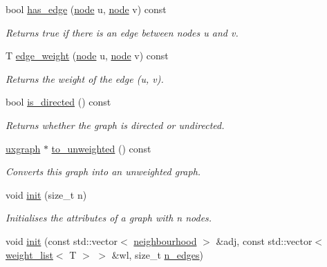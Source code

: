 \begin{DoxyCompactItemize}
bool \hyperlink{classlgraph_1_1wdgraph_a29a56bd2f0ca8f2481ad76b0b14de1ab}{has\-\_\-edge} (\hyperlink{namespacelgraph_a397169dd66adf725210a30fb7251773e}{node} u, \hyperlink{namespacelgraph_a397169dd66adf725210a30fb7251773e}{node} v) const 
\begin{DoxyCompactList}\small\item\em Returns true if there is an edge between nodes {\itshape u} and {\itshape v}. \end{DoxyCompactList}\item 
T \hyperlink{classlgraph_1_1wdgraph_a64032960ab3c9e0c2376d0923b50f328}{edge\-\_\-weight} (\hyperlink{namespacelgraph_a397169dd66adf725210a30fb7251773e}{node} u, \hyperlink{namespacelgraph_a397169dd66adf725210a30fb7251773e}{node} v) const 
\begin{DoxyCompactList}\small\item\em Returns the weight of the edge ({\itshape u}, {\itshape v}). \end{DoxyCompactList}\item 
bool \hyperlink{classlgraph_1_1wdgraph_a52a978ce468c14bcf7474f5c2fa3e713}{is\-\_\-directed} () const 
\begin{DoxyCompactList}\small\item\em Returns whether the graph is directed or undirected. \end{DoxyCompactList}\item 
\hyperlink{classlgraph_1_1uxgraph}{uxgraph} $\ast$ \hyperlink{classlgraph_1_1wdgraph_a693fbb2dbc4c6b1c64186dfac9d3142c}{to\-\_\-unweighted} () const 
\begin{DoxyCompactList}\small\item\em Converts this graph into an unweighted graph. \end{DoxyCompactList}\item 
void \hyperlink{classlgraph_1_1wxgraph_aa09f37bf4a34a0f4f002587203df0125}{init} (size\-\_\-t n)
\begin{DoxyCompactList}\small\item\em Initialises the attributes of a graph with {\itshape n} nodes. \end{DoxyCompactList}\item 
void \hyperlink{classlgraph_1_1wxgraph_a851ab43d7658c185831413394ef915a9}{init} (const std\-::vector$<$ \hyperlink{namespacelgraph_a052e7766c13f3a43cec0aec8173fdede}{neighbourhood} $>$ \&adj, const std\-::vector$<$ \hyperlink{namespacelgraph_a1e0fd5ef0a78b2a92da48adbed265cb6}{weight\-\_\-list}$<$ T $>$ $>$ \&wl, size\-\_\-t \hyperlink{classlgraph_1_1xxgraph_a8ca991d1521cb6ba77e1cd3494ab42be}{n\-\_\-edges})

\end{DoxyCompactItemize}
